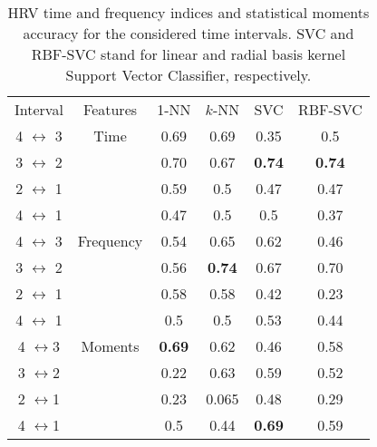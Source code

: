 \begin{table}[t]
\caption{HRV time and frequency indices and statistical moments accuracy for the considered time intervals. SVC and RBF-SVC stand for linear and radial basis kernel Support Vector Classifier, respectively.}
\label{tab:time:freq:5min:moments}
\centering
\begin{tabular}{cccccc}
 Interval          & Features    & 1-NN & $k$-NN & SVC           & RBF-SVC       \\ 
 4 $\leftrightarrow$  3 &Time &0.69 & 0.69   & 0.35          & 0.5           \\ 
 3 $\leftrightarrow$  2 & &0.70 & 0.67   & \textbf{0.74} & \textbf{0.74} \\ 
 2 $\leftrightarrow$  1 & &0.59 & 0.5    & 0.47          & 0.47        \\ 
 4 $\leftrightarrow$  1 & &0.47 & 0.5    & 0.5           & 0.37        \\ 
 4 $\leftrightarrow$  3 &Frequency &0.54 & 0.65          & 0.62 & 0.46    \\
 3 $\leftrightarrow$  2 & &0.56 & \textbf{0.74} & 0.67 & 0.70    \\
 2 $\leftrightarrow$  1 & &0.58 & 0.58          & 0.42 & 0.23    \\
 4 $\leftrightarrow$  1 & &0.5  & 0.5           & 0.53 & 0.44    \\
 4 $\leftrightarrow$3 &Moments &\textbf{0.69}   &   0.62   &   0.46   &   0.58    \\
 3 $\leftrightarrow$2 & &0.22   &   0.63   &   0.59   &   0.52    \\
 2 $\leftrightarrow$1 & &0.23   &  0.065   &   0.48   &   0.29    \\
 4 $\leftrightarrow$1 & & 0.5   &   0.44   &   \textbf{0.69}   &   0.59   \\
\end{tabular}
\end{table}





